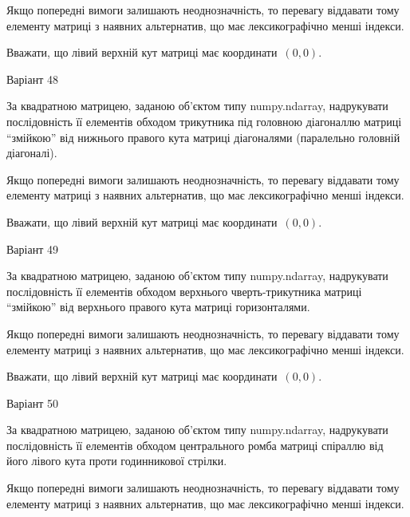 \documentclass[11pt]{article}
\begin{document}
\vspace{2mm}
Якщо попередні вимоги залишають неоднозначність, то перевагу віддавати тому елементу матриці з наявних альтернатив, що має лексикографічно менші індекси.

Вважати, що лівий верхній кут матриці має координати~$(0,0)$.



{\Large \center  Варіант  48\par \bigskip\bigskip}

За квадратною матрицею, заданою об'єктом типу numpy.ndarray, надрукувати послідовність її елементів обходом трикутника під головною діагоналлю матриці ``змійкою'' від нижнього правого кута матриці діагоналями (паралельно головній діагоналі).

\vspace{2mm}
Якщо попередні вимоги залишають неоднозначність, то перевагу віддавати тому елементу матриці з наявних альтернатив, що має лексикографічно менші індекси.

Вважати, що лівий верхній кут матриці має координати~$(0,0)$.



{\Large \center  Варіант  49\par \bigskip\bigskip}

За квадратною матрицею, заданою об'єктом типу numpy.ndarray, надрукувати послідовність її елементів обходом верхнього чверть-трикутника матриці ``змійкою'' від верхнього правого кута матриці горизонталями.

\vspace{2mm}
Якщо попередні вимоги залишають неоднозначність, то перевагу віддавати тому елементу матриці з наявних альтернатив, що має лексикографічно менші індекси.

Вважати, що лівий верхній кут матриці має координати~$(0,0)$.



{\Large \center  Варіант  50\par \bigskip\bigskip}

За квадратною матрицею, заданою об'єктом типу numpy.ndarray, надрукувати послідовність її елементів обходом центрального ромба матриці спіраллю від його лівого кута проти годинникової стрілки.

\vspace{2mm}
Якщо попередні вимоги залишають неоднозначність, то перевагу віддавати тому елементу матриці з наявних альтернатив, що має лексикографічно менші індекси.
\end{document}

